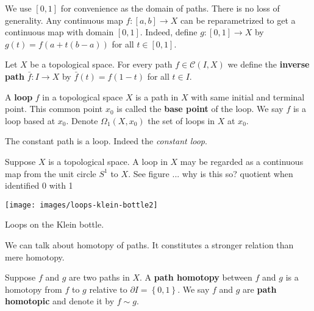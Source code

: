 \begin{remark}
    We use \([0,1]\) for   convenience as the domain of paths. There is no loss of generality. Any continuous map \(f\colon  [a,b]\to X\) can be reparametrized to get a continuous map with domain \([0,1]\).  Indeed, define \(g\colon  [0,1]\to X\) by \(g(t) = f(a+t(b-a))\) for all \(t\in [0,1]\).
\end{remark}

\begin{definition}
    Let \(X\) be a topological space.
    For every path \(f\in \mathcal{C}(I,X)\) we define the \textbf{inverse path} \(\bar{f} \colon I\to X\) by \(\bar{f}(t)=f(1-t)\) for all \(t\in I\).
\end{definition}

\begin{definition}[Loop]
    A \textbf{loop} \(f\) in a topological space \(X\) is a path in \(X\) with same initial and terminal point. This common  point \(x_0\) is called the \textbf{base point} of the loop. We say \(f\) is a loop based at \(x_0\). Denote \(\Omega_1(X,x_0)\) the set of loops in \(X\) at \(x_0\). 
\end{definition}



\begin{example} The constant path is a loop. Indeed the \textit{constant loop}.
    
    Suppose \(X\) is a topological space. A loop in \(X\) may be regarded as a continuous map from the unit circle \(S^1\) to \(X\). See figure ... 
            why is this so? quotient when identified 0 with 1


    \begin{marginfigure}
        \captionsetup{type=figure}
        \texttt{[image: images/loops-klein-bottle2]}
        \vspace*{\baselineskip}
        \caption{Loops on the Klein bottle.}
    \end{marginfigure}
            
\end{example}

We can talk about homotopy of paths. It constitutes  a stronger relation than mere homotopy.

\begin{definition}
    Suppose \(f\) and \(g\) are two paths in \(X\). A \textbf{path homotopy} between \(f\) and \(g\) is a homotopy from \(f\) to \(g\) relative to \(\partial I = \left\{ 0, 1\right\}\). 
    We say  \(f\) and \(g\) are \textbf{path homotopic} and denote it by \(f\sim g\).
\end{definition}

